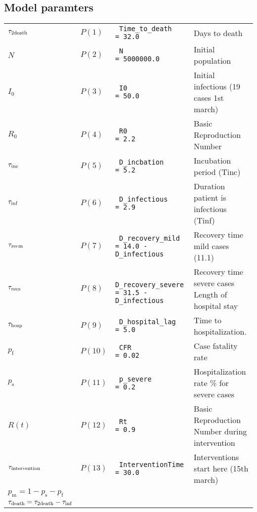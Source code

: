 \documentclass[twoside,11pt]{article}
\newcommand{\rmf}{\mathrm{f}}
\newcommand{\rmm}{\mathrm{m}}
\newcommand{\rms}{\mathrm{s}}
\begin{document}
\subsection{Model paramters}
\begin{center}
\small
\begin{tabular}{llll}
\hline
$\tau_\textrm{2death}$  &  $P(1 )$ &\verb+ Time_to_death     = 32.0              +   &  Days to death                                       \\
$N$     &  $P(2 )$ &\verb+ N                 = 5000000.0           +   &  Initial population                                  \\
$I_0$   &  $P(3 )$ &\verb+ I0                = 50.0                +   &  Initial infectious (19 cases 1st march)             \\
$R_0$   &  $P(4 )$ &\verb+ R0                = 2.2                 +   &  Basic Reproduction Number                           \\
$\tau_\textrm{inc}$ &  $P(5 )$ &\verb+ D_incbation       = 5.2                 +   &  Incubation period (Tinc)                            \\
$\tau_\textrm{inf}$ &  $P(6 )$ &\verb+ D_infectious      = 2.9                 +   &  Duration patient is infectious (Tinf)               \\
$\tau_\textrm{recm}$&  $P(7 )$ &\verb+ D_recovery_mild   = 14.0 - D_infectious +   &  Recovery time mild cases (11.1)                     \\
$\tau_\textrm{recs}$&  $P(8 )$ &\verb+ D_recovery_severe = 31.5 - D_infectious +   &  Recovery time severe cases Length of hospital stay  \\
$\tau_\textrm{hosp}$&  $P(9 )$ &\verb+ D_hospital_lag    = 5.0                 +   &  Time to hospitalization.                            \\
$p_\rmf$&  $P(10)$ &\verb+ CFR               = 0.02                +   &  Case fatality rate                                  \\
$p_\rms$&  $P(11)$ &\verb+ p_severe          = 0.2                 +   &  Hospitalization rate \% for severe cases            \\
$R(t)  $&  $P(12)$ &\verb+ Rt                = 0.9                 +   &  Basic Reproduction Number during intervention       \\
$\tau_\textrm{intervention}$ &  $P(13)$ &\verb+ InterventionTime  = 30.0               +   &  Interventions start here (15th march)               \\
$ p_\rmm  = 1 - p_\rms - p_\rmf $           &&&                                   \\
$\tau_\textrm{death}  = \tau_\textrm{2death}   - \tau_\textrm{inf}$  &&&                                \\
\hline
\end{tabular}
\end{center}
%
%
\end{document}
